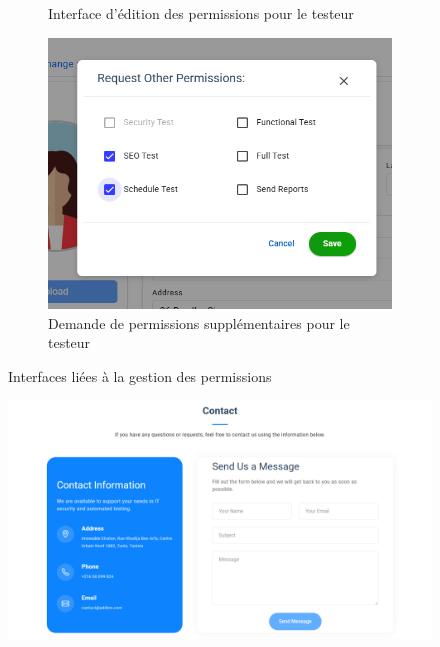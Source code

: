\begin{justify}
\begin{enumerate}[label=\Alph*.]
\begin{figure}[H]
\begin{subfigure}[b]{0.51\linewidth}
                        \caption{\centering Interface d’édition des permissions pour le testeur}
                        \label{fig:subfig-testeur}
                    \end{subfigure}
                    \hfill
                    \begin{subfigure}[b]{0.55\linewidth}
                        \centering
                        \includegraphics[width=\linewidth]{chapitres/ch3Sp1/section/sprint1/img/interface/demande-perm.PNG}
                        \caption{\centering Demande de permissions supplémentaires pour le testeur}
                        \label{fig:subfig-demande}
                    \end{subfigure}
                    \caption{\centering Interfaces liées à la gestion des permissions}
                    \label{fig:permission-interfaces}
                \end{figure}
                \vspace{-0.3cm}
                \begin{figure}[H]
                    \centering
                    \includegraphics[width=\linewidth]{chapitres/ch3Sp1/section/sprint1/img/interface/contact.png}

\end{figure}
\end{enumerate}
\end{justify}
